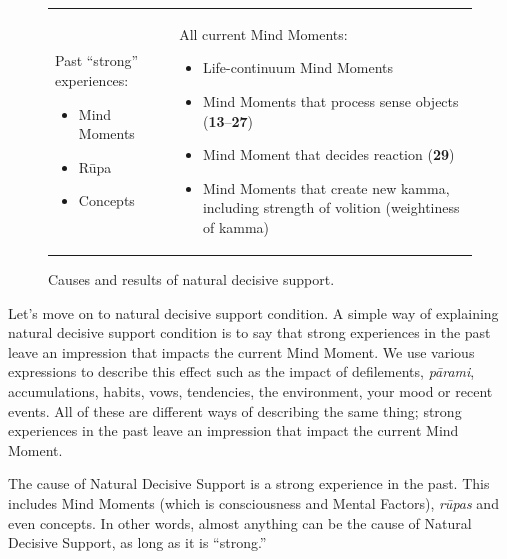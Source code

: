 \begin{figure}[H]
\begin{tabular*}{\textwidth}{L{\tabcolsep} | L{\tabcolsep}}
\toprule
{} &  \\
\midrule

Past “strong” experiences:
\begin{itemize}
\item Mind Moments
\item Rūpa
\item Concepts
\end{itemize}

&
All current Mind Moments:
\begin{itemize}
\item Life-continuum Mind Moments
\item Mind Moments that process sense objects (\textbf{13}--\textbf{27})
\item Mind Moment that decides reaction (\textbf{29})
\item Mind Moments that create new kamma, including strength of volition (weightiness of kamma)\vspace*{-\baselineskip}
\end{itemize}

\\

\bottomrule

\end{tabular*}
\caption{Causes and results of natural decisive support.}
\label{fig:NDS}
\end{figure}

Let’s move on to natural decisive support condition. A simple way of explaining natural decisive support condition is to say that strong experiences in the past leave an impression that impacts the current Mind Moment. We use various expressions to describe this effect such as the impact of defilements, \textit{pārami}, accumulations, habits, vows, tendencies, the environment, your mood or recent events. All of these are different ways of describing the same thing; strong experiences in the past leave an impression that impact the current Mind Moment.

The cause of Natural Decisive Support is a strong experience in the past. This includes Mind Moments (which is consciousness and Mental Factors), \textit{rūpas} and even concepts. In other words, almost anything can be the cause of Natural Decisive Support, as long as it is “strong.”

